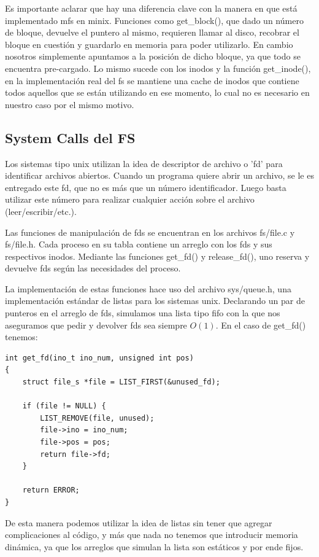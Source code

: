 Es importante aclarar que hay una diferencia clave con la manera en que está
implementado mfs en minix. Funciones como get\_block(), que dado un número de
bloque, devuelve el puntero al mismo,  requieren llamar al
disco, recobrar el bloque en cuestión y guardarlo en memoria para poder
utilizarlo. En cambio nosotros simplemente apuntamos a la posición de dicho
bloque, ya que todo se encuentra pre-cargado. Lo mismo sucede con los inodos y
la función get\_inode(), en la implementación real del fs se mantiene una cache
de inodos que contiene todos aquellos que se están utilizando en ese momento,
lo cual no es necesario en nuestro caso por el mismo motivo.

\subsection{System Calls del FS}

Los sistemas tipo unix utilizan la idea de descriptor de archivo o 'fd' para
identificar archivos abiertos. Cuando un programa quiere abrir un archivo, se le
es entregado este fd, que no es más que un número identificador. Luego basta
utilizar este número para realizar cualquier acción sobre el archivo
(leer/escribir/etc.).

Las funciones de manipulación de fds se encuentran en los archivos fs/file.c y
fs/file.h. Cada proceso en su tabla contiene un arreglo con los fds y
sus respectivos inodos. Mediante las funciones get\_fd() y release\_fd(), uno
reserva y devuelve fds según las necesidades del proceso.

La implementación de estas funciones hace uso del archivo sys/queue.h, una
implementación estándar de listas para los sistemas unix. Declarando un par de
punteros en el arreglo de fds, simulamos una lista tipo fifo con la que nos
aseguramos que pedir y devolver fds sea siempre $O(1)$. En el caso de get\_fd()
tenemos:

\begin{verbatim}
int get_fd(ino_t ino_num, unsigned int pos)
{
    struct file_s *file = LIST_FIRST(&unused_fd);

    if (file != NULL) {
        LIST_REMOVE(file, unused);
        file->ino = ino_num;
        file->pos = pos;
        return file->fd;
    }

    return ERROR;
}
\end{verbatim}

De esta manera podemos utilizar la idea de listas sin tener que agregar
complicaciones al código, y más que nada no tenemos que introducir memoria
dinámica, ya que los arreglos que simulan la lista son estáticos y por ende
fijos.

